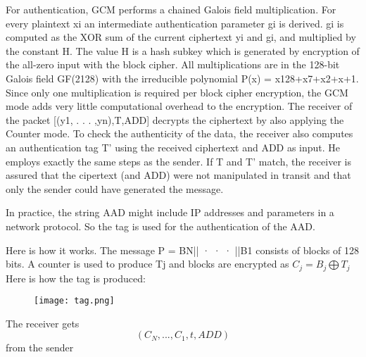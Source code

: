 \documentclass{article}
\begin{document}
For authentication, GCM performs a chained Galois field multiplication. For every
plaintext xi an intermediate authentication parameter gi is derived. gi is computed
as the XOR sum of the current ciphertext yi and gi, and multiplied by the
constant H. The value H is a hash subkey which is generated by encryption of the
all-zero input with the block cipher. All multiplications are in the 128-bit Galois
field GF(2128) with the irreducible polynomial P(x) = x128+x7+x2+x+1. Since
only one multiplication is required per block cipher encryption, the GCM mode adds
very little computational overhead to the encryption.
The receiver of the packet [(y1, . . . ,yn),T,ADD] decrypts the ciphertext by also
applying the Counter mode. To check the authenticity of the data, the receiver also
computes an authentication tag T' using the received ciphertext and ADD as input.
He employs exactly the same steps as the sender. If T and T' match, the receiver is assured that the cipertext (and ADD) were not manipulated in transit and that only the sender could have generated the message. 

In practice, the string AAD might include IP addresses and parameters in a network protocol.
So the tag is used for the authentication of the AAD.

\vspace{1cm}
Here is how it works. The message P = BN|| · · · ||B1 consists of blocks of 128 bits. A counter
is used to produce Tj and blocks are encrypted as ${C_j = B_j \bigoplus T_j}$\\
Here is how the tag is produced:

\begin{figure}[htp]
    \centering
    \texttt{[image: tag.png]}
\end{figure}
The receiver gets $${(C_N,...,C_1,t,ADD)}$$
from the sender
\end{document}
